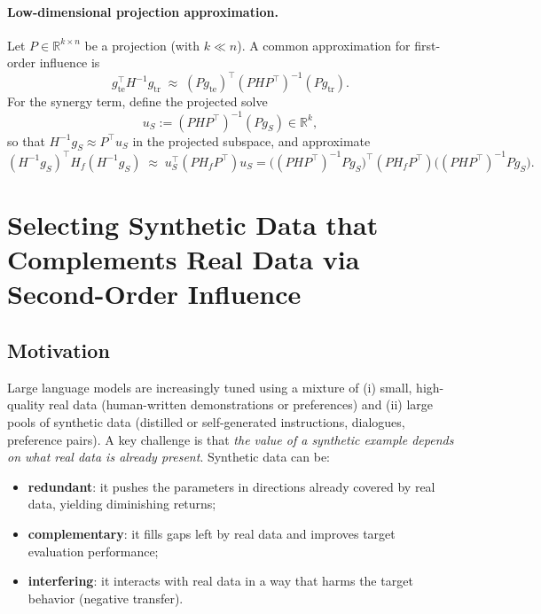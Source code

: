 \documentclass{article}
\theoremstyle{plain}
\theoremstyle{definition}
\theoremstyle{remark}
\begin{document}

\paragraph{Low-dimensional projection approximation.}
Let $P\in\mathbb{R}^{k\times n}$ be a projection (with $k\ll n$).
A common approximation for first-order influence is
\[
g_{\mathrm{te}}^\top H^{-1}g_{\mathrm{tr}}
\;\approx\;
(Pg_{\mathrm{te}})^\top (P H P^\top)^{-1}(Pg_{\mathrm{tr}}).
\]
For the synergy term, define the projected solve
\[
u_S := (P H P^\top)^{-1}(P g_S)\in\mathbb{R}^{k},
\]
so that $H^{-1}g_S \approx P^\top u_S$ in the projected subspace, and approximate
\[
(H^{-1}g_S)^\top H_f(H^{-1}g_S)
\;\approx\;
u_S^\top (P H_f P^\top) u_S
=
\big((P H P^\top)^{-1}P g_S\big)^\top (P H_f P^\top)\big((P H P^\top)^{-1}P g_S\big).
\]


\section{Selecting Synthetic Data that Complements Real Data via Second-Order Influence}
\label{sec:synth_complement}

\subsection{Motivation}
Large language models are increasingly tuned using a mixture of (i) small, high-quality real data
(human-written demonstrations or preferences) and (ii) large pools of synthetic data
(distilled or self-generated instructions, dialogues, preference pairs).
A key challenge is that \emph{the value of a synthetic example depends on what real data is already present}.
Synthetic data can be:
\begin{itemize}
  \item \textbf{redundant}: it pushes the parameters in directions already covered by real data, yielding diminishing returns;
  \item \textbf{complementary}: it fills gaps left by real data and improves target evaluation performance;
  \item \textbf{interfering}: it interacts with real data in a way that harms the target behavior (negative transfer).
\end{itemize}
\end{document}
